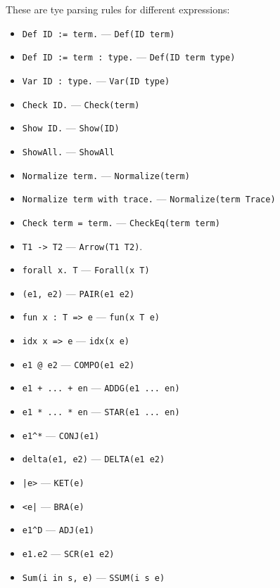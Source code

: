 \documentclass{article}
\begin{document}
These are tye parsing rules for different expressions:
\begin{itemize}
    \item \texttt{Def ID := term.} --- \texttt{Def(ID term)}
    \item \texttt{Def ID := term : type.} --- \texttt{Def(ID term type)}
    \item \texttt{Var ID : type.} --- \texttt{Var(ID type)}
    \item \texttt{Check ID.} --- \texttt{Check(term)}
    \item \texttt{Show ID.} --- \texttt{Show(ID)}
    \item \texttt{ShowAll.} --- \texttt{ShowAll}
    \item \texttt{Normalize term.} --- \texttt{Normalize(term)}
    \item \texttt{Normalize term with trace.} --- \texttt{Normalize(term Trace)}
    \item \texttt{Check term = term.} --- \texttt{CheckEq(term term)}
    \item \texttt{T1 -> T2} --- \texttt{Arrow(T1 T2)}.
    \item \texttt{forall x. T} --- \texttt{Forall(x T)}
    \item \texttt{(e1, e2)} --- \texttt{PAIR(e1 e2)}
    \item \texttt{fun x : T => e} --- \texttt{fun(x T e)}
    \item \texttt{idx x => e} --- \texttt{idx(x e)}
    \item \texttt{e1 @ e2} --- \texttt{COMPO(e1 e2)}
    \item \texttt{e1 + ... + en} --- \texttt{ADDG(e1 ... en)}
    \item \texttt{e1 * ... * en} --- \texttt{STAR(e1 ... en)}
    \item \texttt{e1\^{}*} --- \texttt{CONJ(e1)}
    \item \texttt{delta(e1, e2)} --- \texttt{DELTA(e1 e2)}
    \item \texttt{|e>} --- \texttt{KET(e)}
    \item \texttt{<e|} --- \texttt{BRA(e)}
    \item \texttt{e1\^{}D} --- \texttt{ADJ(e1)}
    \item \texttt{e1.e2} --- \texttt{SCR(e1 e2)}
    \item \texttt{Sum(i in s, e)} --- \texttt{SSUM(i s e)}
\end{itemize}
\end{document}
